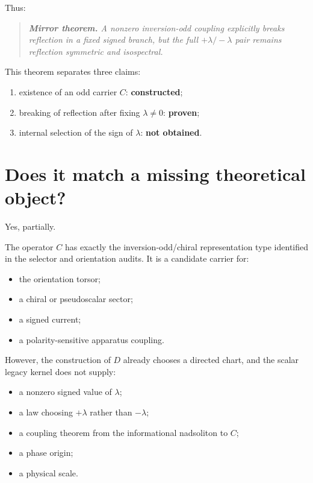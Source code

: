 \documentclass[11pt,a4paper,openany]{report}
\begin{document}
Thus:

\begin{quote}\itshape
\textbf{Mirror theorem.} A nonzero inversion-odd coupling explicitly breaks reflection in a fixed signed branch, but the full \(+\lambda/-\lambda\) pair remains reflection symmetric and isospectral.

\end{quote}

This theorem separates three claims:

\begin{enumerate}
\item 
existence of an odd carrier \(C\): \textbf{constructed};

\item 
breaking of reflection after fixing \(\lambda\ne0\): \textbf{proven};

\item 
internal selection of the sign of \(\lambda\): \textbf{not obtained}.

\end{enumerate}

\section{Does it match a missing theoretical object?}

Yes, partially.

The operator \(C\) has exactly the inversion-odd/\allowbreak{}chiral representation type identified in the selector and orientation audits. It is a candidate carrier for:

\begin{itemize}
\item 
the orientation torsor;

\item 
a chiral or pseudoscalar sector;

\item 
a signed current;

\item 
a polarity-sensitive apparatus coupling.

\end{itemize}

However, the construction of \(D\) already chooses a directed chart, and the scalar legacy kernel does not supply:

\begin{itemize}
\item 
a nonzero signed value of \(\lambda\);

\item 
a law choosing \(+\lambda\) rather than \(-\lambda\);

\item 
a coupling theorem from the informational nadsoliton to \(C\);

\item 
a phase origin;

\item 
a physical scale.

\end{itemize}
\end{document}
